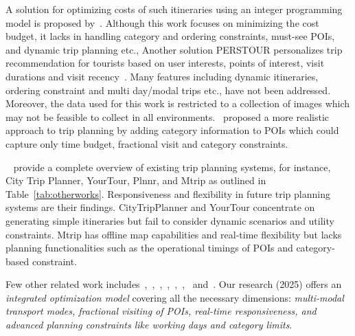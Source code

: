 A solution for optimizing costs of such itineraries using an integer programming model is proposed by~\cite{rambha2024optimized}. Although this work focuses on minimizing the cost budget, it lacks in handling category and ordering constraints, must-see POIs, and dynamic trip planning etc., Another solution PERSTOUR personalizes trip recommendation for tourists based on user interests, points of interest, visit durations and visit recency~\cite{lim2018personalized}. Many features including dynamic itineraries, ordering constraint and multi day/modal trips etc., have not been addressed. Moreover, the data used for this work is restricted to a collection of images which may not be feasible to collect in all environments.~\cite{bolzoni2014efficient} proposed a more realistic approach to trip planning by adding category information to POIs which could capture only time budget, fractional visit and category constraints. 

~\cite{sylejmani2011survey} provide a complete overview of existing trip planning systems, for instance, City Trip Planner, YourTour, Plnnr, and Mtrip as outlined in Table~\ref{tab:otherworks}. Responsiveness and flexibility in future trip planning systems are their findings. CityTripPlanner and YourTour concentrate on generating simple itineraries but fail to consider dynamic scenarios and utility constraints. Mtrip has offline map capabilities and real-time flexibility but lacks planning functionalities such as the operational timings of POIs and category-based constraint.

Few other related work includes~\cite{zheng2021novel},~\cite{yu2017mining},~\cite{jiaoman2018travel},~\cite{sylejmani2017planning},~\cite{zografos2008algorithms},~\cite{rani2018development},~\cite{yu2014optimal} and~\cite{arora2024itinerary}. Our research (2025) offers an \emph{integrated optimization model} covering all the necessary dimensions: \emph{multi-modal transport modes, fractional visiting of POIs, real-time responsiveness, and advanced planning constraints like working days and category limits}. 

